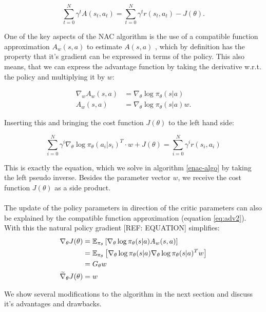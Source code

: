\begin{equation}
	\sum_{t = 0}^{N}\gamma^t A(s_t, a_t) = \sum_{t = 0}^{N}\gamma^t r(s_t, a_t) - J(\theta).
\end{equation}

One of the key aspects of the NAC algorithm is the use of a compatible function approximation $A_w(s, a)$ to estimate $A(s, a)$ \citep{sutton2000policy}, which by definition has the property that it's gradient can be expressed in terms of the policy. This also means, that we can express the advantage function by taking the derivative w.r.t. the policy and multiplying it by $w$:

\begin{align}
	\nabla_w A_w(s,a) &= \nabla_{\theta} \log \pi_{\theta}(s|a)\label{eq:adv1}\\
	A_w(s,a) &= \nabla_{\theta} \log \pi_{\theta}(s|a)w. \label{eq:adv2}
\end{align}

 Inserting this and bringing the cost function $J(\theta)$ to the left hand side:

\begin{equation}
	\sum_{i = 0}^{N} \gamma^i \nabla_{\theta} \log \pi_{\theta}(a_i | s_i)^T \cdot w + J(\theta) = \sum_{i = 0}^{N}\gamma^i r(s_i, a_i)
\end{equation}

This is exactly the equation, which we solve in algorithm \ref{enac-algo} by taking the left pseudo inverse. Besides the parameter vector $w$, we receive the cost function $J(\theta)$ as a side product.
\\\\
The update of the policy parameters in direction of the critic parameters can also be explained by the compatible function approximation (equation \ref{eq:adv2}). With this the natural policy gradient [REF: EQUATION] simplifies:
\begin{align}
\nabla_\theta J(\theta) &= \operatorname{\mathbb{E}}_{\pi_{\theta}} \left[\nabla_{\theta} \log \pi_{\theta}(s|a) A_w(s,a)\right]\\
&= \operatorname{\mathbb{E}}_{\pi_{\theta}}  \left[\nabla_{\theta} \log \pi_{\theta}(s|a) \nabla_{\theta} \log \pi_{\theta}(s|a)^T w\right]\\
&= G_\theta w\\
\widetilde{\nabla}_{\theta} J(\theta) &= w
\end{align}

We show several modifications to the algorithm in the next section and discuss it's advantages and drawbacks.

